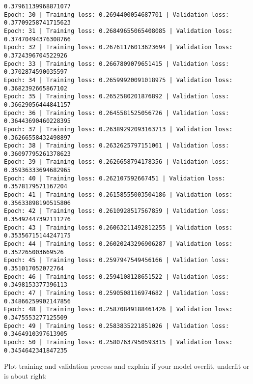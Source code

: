 \documentclass[11pt]{article}
\begin{document}
\begin{Verbatim}[commandchars=\\\{\}]
0.37961139968871077
Epoch: 30 | Training loss: 0.2694400054687701 | Validation loss:
0.37709258741715623
Epoch: 31 | Training loss: 0.26849655065408085 | Validation loss:
0.37470494376308766
Epoch: 32 | Training loss: 0.26761176013623694 | Validation loss:
0.3724396704522926
Epoch: 33 | Training loss: 0.2667809079651415 | Validation loss:
0.3702874590035597
Epoch: 34 | Training loss: 0.26599920091018975 | Validation loss:
0.3682392665867102
Epoch: 35 | Training loss: 0.2652580201876892 | Validation loss:
0.36629056444841157
Epoch: 36 | Training loss: 0.2645581525056726 | Validation loss:
0.36443690460228395
Epoch: 37 | Training loss: 0.26389292093163713 | Validation loss:
0.36266558432498897
Epoch: 38 | Training loss: 0.2632625797151061 | Validation loss:
0.36097795261378623
Epoch: 39 | Training loss: 0.2626658794178356 | Validation loss:
0.35936333694682965
Epoch: 40 | Training loss: 0.262107592667451 | Validation loss:
0.3578179571167204
Epoch: 41 | Training loss: 0.26158555003504186 | Validation loss:
0.35633898190515806
Epoch: 42 | Training loss: 0.2610928517567859 | Validation loss:
0.35492447392111276
Epoch: 43 | Training loss: 0.26063211492812255 | Validation loss:
0.35356715144247175
Epoch: 44 | Training loss: 0.26020243296906287 | Validation loss:
0.352265003669526
Epoch: 45 | Training loss: 0.2597947549456166 | Validation loss:
0.351017052072764
Epoch: 46 | Training loss: 0.2594108128651522 | Validation loss:
0.3498153377396113
Epoch: 47 | Training loss: 0.2590508116974682 | Validation loss:
0.34866259902147856
Epoch: 48 | Training loss: 0.25870849188461426 | Validation loss:
0.3475553277125509
Epoch: 49 | Training loss: 0.2583835221851026 | Validation loss:
0.3464910397613905
Epoch: 50 | Training loss: 0.25807637950593315 | Validation loss:
0.3454642341847235
    \end{Verbatim}

    Plot training and validation process and explain if your model overfit,
underfit or is about right:
\end{document}
